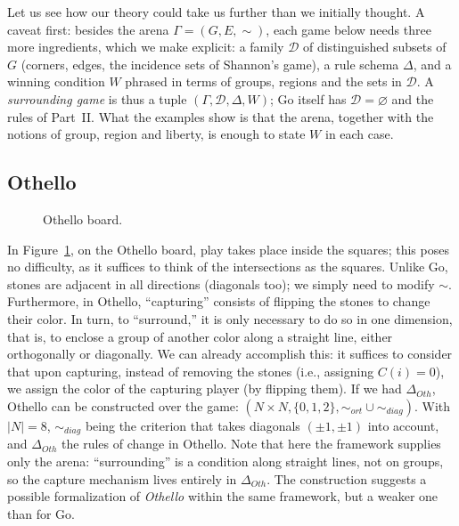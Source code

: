 Let us see how our theory could take us further than we initially thought. A caveat first: besides the arena $\Gamma=(G,E,\sim)$, each game below needs three more ingredients, which we make explicit: a family $\mathcal{D}$ of distinguished subsets of $G$ (corners, edges, the incidence sets of Shannon's game), a rule schema $\Delta$, and a winning condition $W$ phrased in terms of groups, regions and the sets in $\mathcal{D}$. A \emph{surrounding game} is thus a tuple $(\Gamma,\mathcal{D},\Delta,W)$; Go itself has $\mathcal{D}=\varnothing$ and the rules of Part~II. What the examples show is that the arena, together with the notions of group, region and liberty, is enough to state $W$ in each case.

\subsection*{Othello}

\begin{figure}
	
	\centering
	\begin{goban}
		[goban={
			size=9,
			scale=1.25,
			background ={
				fill = {color = othello},
				line = {color = othelloborder}},
			hoshi = {false}
		}]
	\end{goban}
	\caption{Othello board.}
	\label{fig:Tab_Othello}
\end{figure}In Figure~\ref{fig:Tab_Othello}, on the Othello board, play takes place inside the squares; this poses no difficulty, as it suffices to think of the intersections as the squares. Unlike Go, stones are adjacent in all directions (diagonals too); we simply need to modify \(\sim\). Furthermore, in Othello, ``capturing'' consists of flipping the stones to change their color. In turn, to ``surround,'' it is only necessary to do so in one dimension, that is, to enclose a group of another color along a straight line, either orthogonally or diagonally. We can already accomplish this: it suffices to consider that upon capturing, instead of removing the stones (i.e., assigning \(C(i)=0\)), we assign the color of the capturing player (by flipping them). If we had \(\Delta_{Oth}\), Othello can be constructed over the game:
$(N\times N, \{0,1,2\}, \sim_{ort} \cup \sim_{diag}).$	With $|N|=8$, $\sim_{diag}$ being the criterion that takes diagonals $(\pm1,\pm1)$ into account, and $\Delta_{Oth}$ the rules of change in Othello. Note that here the framework supplies only the arena: ``surrounding'' is a condition along straight lines, not on groups, so the capture mechanism lives entirely in $\Delta_{Oth}$. The construction suggests a possible formalization of \textit{Othello} within the same framework, but a weaker one than for Go.

